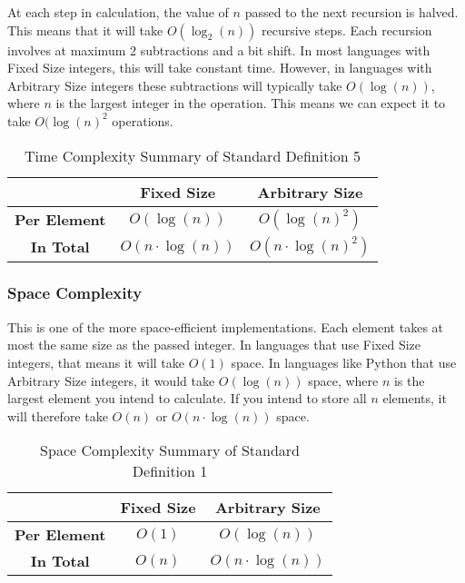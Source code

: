 \documentclass[conference]{IEEEtran}
\begin{document}
At each step in calculation, the value of $n$ passed to the next recursion is halved. This means that it will take $O(\log_2(n))$ recursive steps. Each recursion involves at maximum 2 subtractions and a bit shift. In most languages with Fixed Size integers, this will take constant time. However, in languages with Arbitrary Size integers these subtractions will typically take $O(\log(n))$, where $n$ is the largest integer in the operation. This means we can expect it to take $O(\log(n)^2$ operations.

\renewcommand{\arraystretch}{1.25}
\begin{table}[H]
    \centering
    \caption{Time Complexity Summary of Standard Definition 5}
    \begin{tabular}{|c|c|c|}
        \hline
        & \textbf{Fixed Size} & \textbf{Arbitrary Size} \\
        \hline
        \textbf{Per Element} & $O(\log(n))$ & $O(\log(n)^2)$ \\
        \hline
        \textbf{In Total} & $O(n \cdot \log(n))$ & $O(n \cdot \log(n)^2)$ \\
        \hline
    \end{tabular}
    \label{tab:time_p2_d05}
\end{table}
\renewcommand{\arraystretch}{1}

\subsubsection{Space Complexity}

This is one of the more space-efficient implementations. Each element takes at most the same size as the passed integer. In languages that use Fixed Size integers, that means it will take $O(1)$ space. In languages like Python that use Arbitrary Size integers, it would take $O(\log(n))$ space, where $n$ is the largest element you intend to calculate. If you intend to store all $n$ elements, it will therefore take $O(n)$ or $O(n \cdot \log(n))$ space.

\begin{table}[H]
    \centering
    \caption{Space Complexity Summary of Standard Definition 1}
    \begin{tabular}{|c|c|c|}
        \hline
        & \textbf{Fixed Size} & \textbf{Arbitrary Size} \\
        \hline
        \textbf{Per Element} & $O(1)$ & $O(\log(n))$ \\
        \hline
        \textbf{In Total} & $O(n)$ & $O(n \cdot \log(n))$ \\
        \hline
    \end{tabular}
    \label{tab:space_p2_d05}
\end{table}
\end{document}
